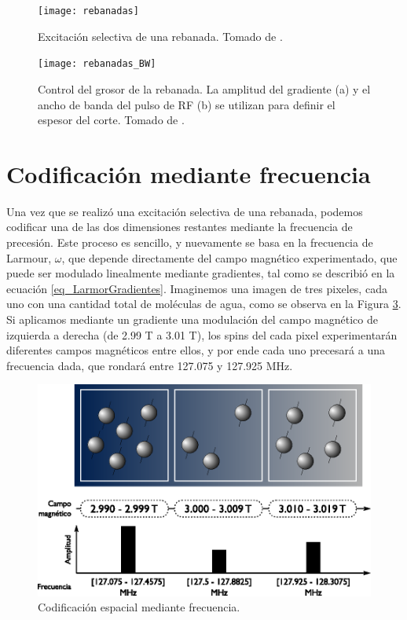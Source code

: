 \begin{figure}[htb]
 \begin{figg}
   \texttt{[image: rebanadas]}
   \caption{Excitación selectiva de una rebanada. Tomado de \cite{mcrobbie2007mri}.}
 \label{fig:rebanadas}
 \end{figg}
\end{figure}

\begin{figure}[htb]
 \begin{figg}
   \texttt{[image: rebanadas\_BW]}
   \caption{Control del grosor de la rebanada. La amplitud del gradiente (a) y el ancho de banda del pulso de RF (b) se utilizan para definir el espesor del corte. Tomado de \cite{mcrobbie2007mri}.}
 \label{fig:rebanadas_BW}
 \end{figg}
\end{figure}



\section{Codificación mediante frecuencia}
Una vez que se realizó una excitación selectiva de una rebanada, podemos codificar una de las dos dimensiones restantes mediante la frecuencia de precesión. Este proceso es sencillo, y nuevamente se basa en la frecuencia de Larmour, $\omega$, que depende directamente del campo magnético experimentado, que puede ser modulado linealmente mediante gradientes, tal como se describió en la ecuación \ref{eq_LarmorGradientes}. Imaginemos una imagen de tres pixeles, cada uno con una cantidad total de moléculas de agua, como se observa en la Figura \ref{fig:gradientes2}. Si aplicamos mediante un gradiente una modulación del campo magnético de izquierda a derecha (de 2.99 T a 3.01 T), los spins del cada pixel experimentarán diferentes campos magnéticos entre ellos, y por ende cada uno precesará a una frecuencia dada, que rondará entre 127.075 y 127.925 MHz. 
 
\begin{figure}[htb]
 \begin{figg}
   \includegraphics[width=\textwidth]{gradientes2}
   \caption{Codificación espacial mediante frecuencia.}
 \label{fig:gradientes2}
 \end{figg}
\end{figure}

